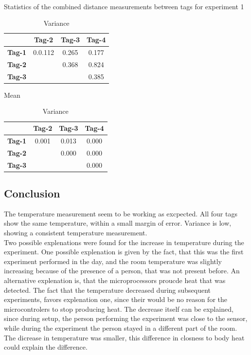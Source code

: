 \begin{table}[ht]
\centering
\caption{Statistics of the combined distance measurements between tags for experiment 1}
\begin{minipage}{0.45\textwidth}
\centering
\begin{tabular}{|c|c c c|}
\hline
		& \textbf{Tag-2} & \textbf{Tag-3} & \textbf{Tag-4} \\
\hline
\textbf{Tag-1}    & 0.0.112 & 0.265 & 0.177 \\
\textbf{Tag-2}   &  & 0.368 & 0.824 \\
\textbf{Tag-3}   &  &  & 0.385 \\
\hline
\end{tabular}
\caption*{Mean}
\end{minipage}
\hfill
\begin{minipage}{0.45\textwidth}
\centering
\begin{tabular}{|c|c c c|}
\hline
		& \textbf{Tag-2} & \textbf{Tag-3} & \textbf{Tag-4} \\
\hline
\textbf{Tag-1}    & 0.001 & 0.013 & 0.000 \\
\textbf{Tag-2}   &  & 0.000 & 0.000 \\
\textbf{Tag-3}   &  &  & 0.000 \\
\hline
\end{tabular}
\caption*{Variance}
\end{minipage}
\label{tab:exp1_var_distanc}
\end{table}


\subsection{Conclusion}
\label{s:exp1_conclustion}
The temperature measurement seem to be working as excpected.
All four tags show the same temperature, within a small margin of error.
Variance is low, showing a consistent temperature measurement.\\
Two possible explenations were found for the increase in temperature during the experiment.
One possible explenation is given by the fact, that this was the first experiment performed in the day, and the room temperature was slightly increasing because of the presence of a person, that was not present before.
An alternative explenation is, that the microprocessors proucde heat that was detected.
The fact that the temperature decreased during subsequent experiments, favors explenation one, since their would be no reason for the microcontrolers to stop producing heat.
The decrease itself can be explained, since during setup, the person performing the experiment was close to the sensor, while during the experiment the person stayed in a different part of the room. The dicrease in temperature was smaller, this difference in closness to body heat could explain the difference.



